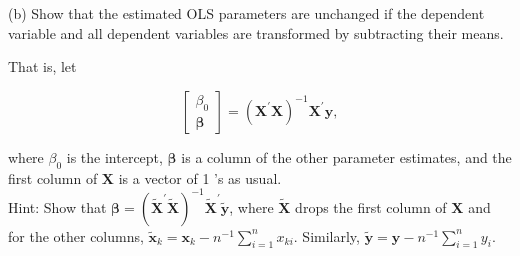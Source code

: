 \documentclass[11pt]{article}
\begin{document}
(b) Show that the estimated OLS parameters are unchanged if the dependent variable and all dependent variables are transformed by subtracting their means.

That is, let

$$
\left[\begin{array}{c}
\beta_0 \\
\boldsymbol{\beta}
\end{array}\right]=\left(\boldsymbol{X}^{\prime} \boldsymbol{X}\right)^{-1} \boldsymbol{X}^{\prime} \boldsymbol{y},
$$

where $\beta_0$ is the intercept, $\boldsymbol{\beta}$ is a column of the other parameter estimates, and the first column of $\boldsymbol{X}$ is a vector of 1 's as usual.\\

Hint: Show that $\boldsymbol{\beta}=\left(\widetilde{\boldsymbol{X}}^{\prime} \widetilde{\boldsymbol{X}}\right)^{-1} \widetilde{\boldsymbol{X}}^{\prime} \widetilde{\boldsymbol{y}}$, where $\widetilde{\boldsymbol{X}}$ drops the first column of $\boldsymbol{X}$ and for the other columns, $\widetilde{\boldsymbol{x}}_k=\boldsymbol{x}_k-n^{-1} \sum_{i=1}^n x_{k i}$. Similarly, $\widetilde{\boldsymbol{y}}=\boldsymbol{y}-n^{-1} \sum_{i=1}^n y_i$.
\end{document}
